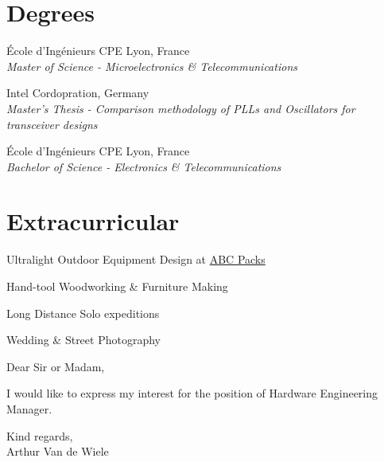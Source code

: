 \documentclass[10pt,a4paper]{moderncv}
\newcommand*{\educationentry}[3]{
    {#2, #3}\\
    {\itshape #1}
    \par\addvspace{1em}
    }
\begin{document}
\noindent
\begin{minipage}[t]{0.60\textwidth}
    
    \section{Degrees}

    \educationentry{Master of Science - Microelectronics \& Telecommunications}{École d'Ingénieurs CPE Lyon}{France}

    \educationentry{Master's Thesis - Comparison methodology of PLLs and Oscillators for transceiver designs}{Intel Cordopration}{Germany}

    \educationentry{Bachelor of Science - Electronics \& Telecommunications}{École d'Ingénieurs CPE Lyon}{France}

\end{minipage}
\hfill
\begin{minipage}[t]{0.35\textwidth}

    \section{Extracurricular}

    Ultralight Outdoor Equipment Design at \href{https://abcpacks.com}{ABC Packs}
    \par Hand-tool Woodworking \& Furniture Making
    \par Long Distance Solo expeditions
    \par Wedding \& Street Photography

\end{minipage}

\clearpage

\date{\today}
\opening{}
\closing{}

\makelettertitle

Dear Sir or Madam,

I would like to express my interest for the position of Hardware Engineering Manager.

Kind regards,\\
Arthur Van de Wiele
\end{document}
